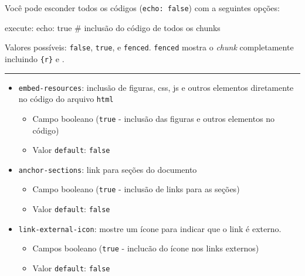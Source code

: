 \documentclass[
  10pt,
  ignorenonframetext,
]{beamer}
\newenvironment{Shaded}{\begin{snugshade}}{\end{snugshade}}
\newcommand{\AttributeTok}[1]{\textcolor[rgb]{0.40,0.45,0.13}{#1}}
\newcommand{\CharTok}[1]{\textcolor[rgb]{0.13,0.47,0.30}{#1}}
\newcommand{\CommentTok}[1]{\textcolor[rgb]{0.37,0.37,0.37}{#1}}
\newcommand{\FunctionTok}[1]{\textcolor[rgb]{0.28,0.35,0.67}{#1}}
\newcommand{\KeywordTok}[1]{\textcolor[rgb]{0.00,0.23,0.31}{#1}}
\providecommand{\tightlist}{%
  \setlength{\itemsep}{0pt}\setlength{\parskip}{0pt}}\usepackage{longtable,booktabs,array}
\newcommand*{\regrafina}{\rule{\textwidth}{0.5pt}}
\begin{document}
\begin{frame}[fragile]
Você pode esconder todos os códigos (\texttt{echo:\ false}) com a
seguintes opções:

\begin{Shaded}
\begin{Highlighting}[]
\FunctionTok{execute}\KeywordTok{:}
\AttributeTok{  }\FunctionTok{echo}\KeywordTok{:}\AttributeTok{ }\CharTok{true}\CommentTok{ \# inclusão do código de todos os chunks}
\end{Highlighting}
\end{Shaded}

Valores possíveis: \texttt{false}, \texttt{true}, e \texttt{fenced}.
\texttt{fenced} mostra o \emph{chunk} completamente incluindo
\texttt{\textasciigrave{}\textasciigrave{}\textasciigrave{}\{r\}} e
\texttt{\textasciigrave{}\textasciigrave{}\textasciigrave{}}.

\regrafina

\begin{itemize}
\tightlist
\item
  \texttt{embed-resources}: inclusão de figuras, css, js e outros
  elementos diretamente no código do arquivo \texttt{html}

  \begin{itemize}
  \tightlist
  \item
    Campo booleano (\texttt{true} - inclusão das figuras e outros
    elementos no código)
  \item
    Valor \texttt{default}: \texttt{false}
  \end{itemize}
\item
  \texttt{anchor-sections}: link para seções do documento

  \begin{itemize}
  \tightlist
  \item
    Campo booleano (\texttt{true} - inclusão de links para as seções)
  \item
    Valor \texttt{default}: \texttt{false}
  \end{itemize}
\item
  \texttt{link-external-icon}: mostre um ícone para indicar que o link é
  externo.

  \begin{itemize}
  \tightlist
  \item
    Campos booleano (\texttt{true} - inclucão do ícone nos links
    externos)
  \item
    Valor \texttt{default}: \texttt{false}
  \end{itemize}
\end{itemize}
\end{frame}
\end{document}
